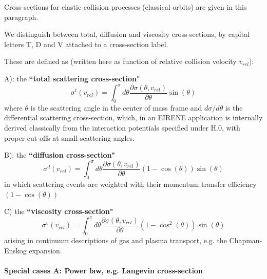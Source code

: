 \documentclass[12pt,dvipdfmx]{article}
\begin{document}
Cross-sections for elastic collision processes (classical orbits) are given in this paragraph.

We distinguish between total, diffusion and viscosity cross-sections, by capital letters T, D and V
attached to a cross-section label.

These are defined as (written here as function of relative collision velocity $v_{rel}$):

A): the \textbf{``total scattering cross-section"}
\begin{equation}
\sigma^t(v_{rel}) = \int_0^{\pi} d\theta \frac{\partial\sigma(\theta,v_{rel})}{\partial\theta} \sin(\theta)
\end{equation}
where $\theta$ is the scattering angle in the center of mass frame and $d\sigma/d\theta$ is the differential scattering cross-section,
which, in an EIRENE application is internally derived classically from the interaction potentials specified under H.0, with proper cut-offs
at small scattering angles.

B): the \textbf{``diffusion cross-section"}
\begin{equation}
\sigma^d(v_{rel}) = \int_0^{\pi} d\theta \frac{\partial\sigma(\theta,v_{rel})}{\partial\theta} (1-\cos(\theta)) \sin(\theta)
\end{equation}
in which scattering events are weighted with their momentum transfer efficiency  $(1-\cos(\theta))$

C) the \textbf{``viscosity cross-section"}
\begin{equation}
\sigma^v(v_{rel}) = \int_0^{\pi} d\theta \frac{\partial\sigma(\theta,v_{rel})}{\partial\theta} (1-\cos^2(\theta)) \sin(\theta)
\end{equation}
arising in continuum descriptions of gas and plasma transport, e.g. the Chapman-Enskog expansion.

\paragraph*{\textbf{Special cases A: Power law, e.g. Langevin cross-section}}
\end{document}

